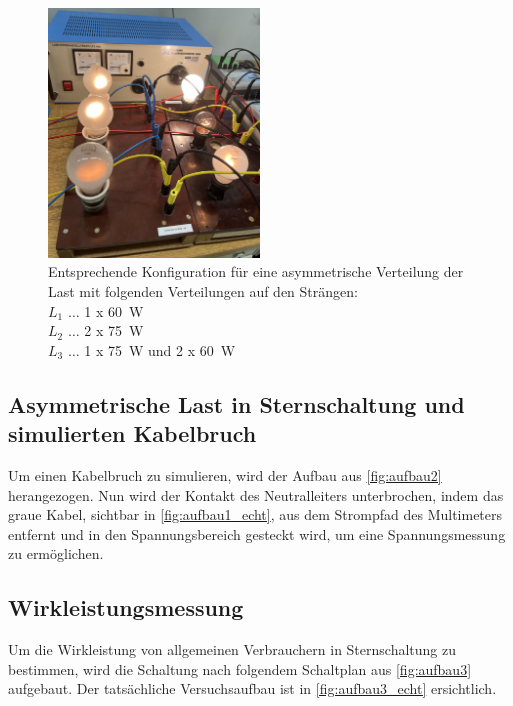 \documentclass[12pt,english,ngerman]{scrartcl}
\begin{document}
\begin{figure}[H]
	\begin{center}
		\includegraphics[width = 0.5\textwidth]{./figures/lampen.png}
	\end{center}
	\caption[Entsprechende Konfiguration für eine asymmetrische Verteilung der Last]
	{Entsprechende Konfiguration für eine asymmetrische Verteilung der Last mit
		folgenden Verteilungen auf den Strängen: \\
		$L_1$ \(\dots\) 1 x \SI[]{60}{\watt}     \\
		$L_2$ \(\dots\) 2 x \SI[]{75}{\watt}     \\
		$L_3$ \(\dots\) 1 x \SI[]{75}{\watt} und 2 x \SI[]{60}{\watt}
	}\label{fig:lampenasym}
\end{figure}

\subsection{Asymmetrische Last in Sternschaltung und simulierten Kabelbruch}

Um einen Kabelbruch zu simulieren, wird der Aufbau aus \autoref{fig:aufbau2}
herangezogen. Nun wird der Kontakt des Neutralleiters unterbrochen, indem das
graue Kabel, sichtbar in \autoref{fig:aufbau1_echt}, aus dem Strompfad des
Multimeters entfernt und in den Spannungsbereich gesteckt wird, um eine
Spannungsmessung zu ermöglichen.

\subsection{Wirkleistungsmessung}

Um die Wirkleistung von allgemeinen Verbrauchern in Sternschaltung zu
bestimmen, wird die Schaltung nach folgendem Schaltplan aus
\autoref{fig:aufbau3} aufgebaut. Der tatsächliche Versuchsaufbau ist in
\autoref{fig:aufbau3_echt} ersichtlich.
\end{document}
